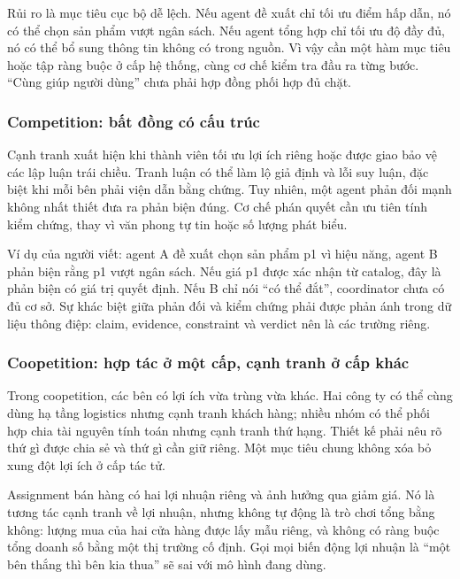 Rủi ro là mục tiêu cục bộ dễ lệch. Nếu agent đề xuất chỉ tối ưu điểm hấp
dẫn, nó có thể chọn sản phẩm vượt ngân sách. Nếu agent tổng hợp chỉ tối
ưu độ đầy đủ, nó có thể bổ sung thông tin không có trong nguồn. Vì vậy
cần một hàm mục tiêu hoặc tập ràng buộc ở cấp hệ thống, cùng cơ chế kiểm
tra đầu ra từng bước. ``Cùng giúp người dùng'' chưa phải hợp đồng phối
hợp đủ chặt.

\subsubsection{Competition: bất đồng có cấu
trúc}\label{competition-bux1ea5t-ux111ux1ed3ng-cuxf3-cux1ea5u-truxfac}

Cạnh tranh xuất hiện khi thành viên tối ưu lợi ích riêng hoặc được giao
bảo vệ các lập luận trái chiều. Tranh luận có thể làm lộ giả định và lỗi
suy luận, đặc biệt khi mỗi bên phải viện dẫn bằng chứng. Tuy nhiên, một
agent phản đối mạnh không nhất thiết đưa ra phản biện đúng. Cơ chế phán
quyết cần ưu tiên tính kiểm chứng, thay vì văn phong tự tin hoặc số
lượng phát biểu.

Ví dụ của người viết: agent A đề xuất chọn sản phẩm p1 vì hiệu năng,
agent B phản biện rằng p1 vượt ngân sách. Nếu giá p1 được xác nhận từ
catalog, đây là phản biện có giá trị quyết định. Nếu B chỉ nói ``có thể
đắt'', coordinator chưa có đủ cơ sở. Sự khác biệt giữa phản đối và kiểm
chứng phải được phản ánh trong dữ liệu thông điệp: claim, evidence,
constraint và verdict nên là các trường riêng.

\subsubsection{Coopetition: hợp tác ở một cấp, cạnh tranh ở cấp
khác}\label{coopetition-hux1ee3p-tuxe1c-ux1edf-mux1ed9t-cux1ea5p-cux1ea1nh-tranh-ux1edf-cux1ea5p-khuxe1c}

Trong coopetition, các bên có lợi ích vừa trùng vừa khác. Hai công ty có
thể cùng dùng hạ tầng logistics nhưng cạnh tranh khách hàng; nhiều nhóm
có thể phối hợp chia tài nguyên tính toán nhưng cạnh tranh thứ hạng.
Thiết kế phải nêu rõ thứ gì được chia sẻ và thứ gì cần giữ riêng. Một
mục tiêu chung không xóa bỏ xung đột lợi ích ở cấp tác tử.

Assignment bán hàng có hai lợi nhuận riêng và ảnh hưởng qua giảm giá. Nó
là tương tác cạnh tranh về lợi nhuận, nhưng không tự động là trò chơi
tổng bằng không: lượng mua của hai cửa hàng được lấy mẫu riêng, và không
có ràng buộc tổng doanh số bằng một thị trường cố định. Gọi mọi biến
động lợi nhuận là ``một bên thắng thì bên kia thua'' sẽ sai với mô hình
đang dùng.

